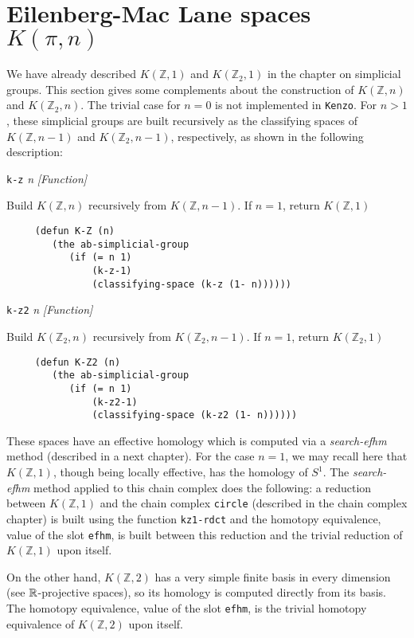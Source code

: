 \section {Eilenberg-Mac Lane spaces $K(\pi,n)$}

We have already described $K(\mathbb{Z},1)$ and $K(\mathbb{Z}_2,1)$ in the chapter on simplicial groups.
This section gives some complements about the construction of $K(\mathbb{Z},n)$ and $K(\mathbb{Z}_2,n)$. The trivial case
for $n=0$ is not implemented in {\tt Kenzo}. For $n > 1$, these simplicial groups
are built recursively as the classifying spaces of $K(\mathbb{Z},n-1)$ and $K(\mathbb{Z}_2,n-1)$, respectively, as shown
in the following description:
\par
\vskip 0.40cm
{\parindent=0mm
{\leftskip=5mm
{\tt k-z} {\em n} \hfill {\em [Function]} \par}
{\leftskip=15mm
Build $K(\mathbb{Z},n)$ recursively from $K(\mathbb{Z},n-1)$. If $n=1$, return $K(\mathbb{Z},1)$
{\footnotesize\begin{verbatim}
     (defun K-Z (n)
        (the ab-simplicial-group
           (if (= n 1)
               (k-z-1)
               (classifying-space (k-z (1- n))))))
\end{verbatim}}
\par}
{\leftskip=5mm
{\tt k-z2} {\em n} \hfill {\em [Function]} \par}
{\leftskip=15mm
Build $K(\mathbb{Z}_2,n)$ recursively from $K(\mathbb{Z}_2,n-1)$. If $n=1$, return $K(\mathbb{Z}_2,1)$
{\footnotesize\begin{verbatim}
     (defun K-Z2 (n)
        (the ab-simplicial-group
           (if (= n 1)
               (k-z2-1)
               (classifying-space (k-z2 (1- n))))))
\end{verbatim}}
\par}}
These spaces have an effective homology which is computed via a {\em search-efhm} method (described in a next chapter).
For the case $n=1$, we may recall here that $K(\mathbb{Z},1)$, though being locally effective,
has the homology of $S^1$. The  {\em search-efhm} method applied to this chain complex does the following:  a reduction
between $K(\mathbb{Z},1)$ and the chain complex {\tt circle} (described in the chain complex chapter) is
built using the function {\tt kz1-rdct} and the homotopy equivalence, value of the slot {\tt efhm}, is
built between this reduction and the trivial reduction of $K(\mathbb{Z},1)$ upon itself.\par
On the other hand, $K(\mathbb{Z},2)$ has a very simple finite basis in every dimension (see ${\mathbb{R}}$-projective
spaces), so its homology is computed directly from its basis. The  homotopy
equivalence, value of the slot {\tt efhm}, is the trivial homotopy equivalence of $K(\mathbb{Z},2)$ upon
itself.
\newpage

